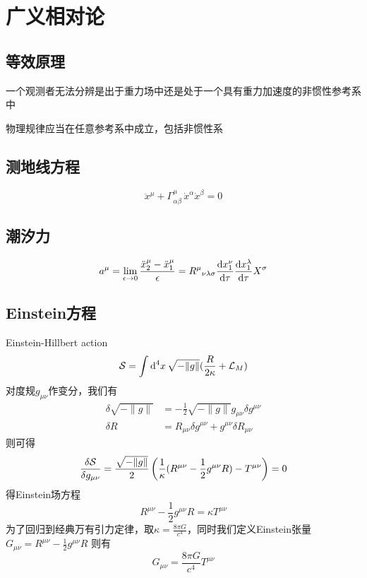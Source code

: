 \documentclass[a4paper]{report}
\begin{document}
\chapter{广义相对论}


\section{等效原理}
\begin{theorem}[等效原理]
   一个观测者无法分辨是出于重力场中还是处于一个具有重力加速度的非惯性参考系中
\end{theorem}
\begin{theorem}[广义相对性原理]
   物理规律应当在任意参考系中成立，包括非惯性系
\end{theorem}
\section{测地线方程}
\begin{equation}
    \ddot x^\mu + \Gamma^\mu_{\alpha\beta} \,\dot x^\alpha\dot x^\beta = 0
\end{equation}

\section{潮汐力}
\begin{equation}
    a^\mu = \lim_{\epsilon\to0}\frac{\ddot x_2^\mu-\ddot x_1^\mu}{\epsilon} = {R^\mu}_{\nu\lambda\sigma} \frac{\mathrm{d} x_1^\nu}{\mathrm{d}\tau} \frac{\mathrm{d} x_1^\lambda}{\mathrm{d}\tau}X^\sigma 
\end{equation}

\section{Einstein方程}
Einstein-Hillbert action
\begin{equation}
    \mathcal{S} = \int \mathrm{d}^4x\,\sqrt{-\lVert g \rVert } (\frac{{R}}{2\kappa} +\mathcal{L}_M)
\end{equation}
对度规$g_{\mu\nu}$作变分，我们有
\begin{equation}
    \begin{split}
        \delta \sqrt{-\lVert g\rVert} &= -\frac{1}{2}\sqrt{-\lVert g\rVert} g_{\mu\nu}\delta g^{\mu\nu}\\
        \delta R &= R_{\mu\nu}\delta g^{\mu\nu} + g^{\mu\nu}\delta R_{\mu\nu}
    \end{split}
\end{equation}
则可得
\begin{equation}
    \frac{\delta\mathcal{S}}{\delta g_{\mu\nu}} = \frac{\sqrt{- \lVert g \rVert } }{2}\left( \frac{1}{\kappa}(R^{\mu\nu}-\frac{1}{2}g^{\mu\nu}R)-T^{\mu\nu}  \right) = 0
\end{equation}
得Einstein场方程
\begin{equation}
    R^{\mu\nu}-\frac{1}{2}g^{\mu\nu}R = \kappa T^{\mu\nu}
\end{equation}
为了回归到经典万有引力定律，取$\kappa = \frac{8\pi G}{c^4}$，同时我们定义Einstein张量$G_{\mu\nu} =R^{\mu\nu}-\frac{1}{2}g^{\mu\nu}R $
则有
\begin{equation}
    G_{\mu\nu} = \frac{8\pi G}{c^4} T^{\mu\nu}
\end{equation}
\end{document}
